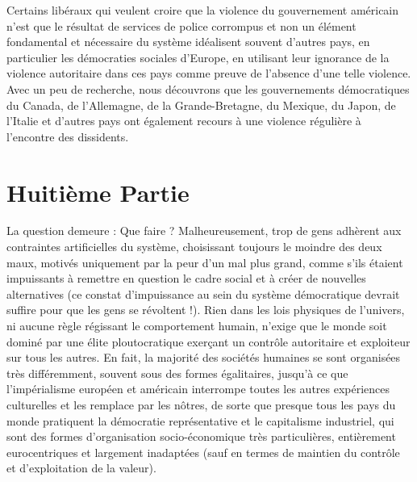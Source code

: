 Certains libéraux qui veulent croire que la violence du gouvernement américain n'est que le résultat de services de police corrompus et non un élément fondamental et nécessaire du système idéalisent souvent d'autres pays, en particulier les démocraties sociales d'Europe, en utilisant leur ignorance de la violence autoritaire dans ces pays comme preuve de l'absence d'une telle violence. Avec un peu de recherche, nous découvrons que les gouvernements démocratiques du Canada, de l'Allemagne, de la Grande-Bretagne, du Mexique, du Japon, de l'Italie et d'autres pays ont également recours à une violence régulière à l'encontre des dissidents.

\chapter*{\textbf{Huitième Partie}}\hypertarget{huitime-partie}{}\label{huitime-partie}

La question demeure : Que faire ? Malheureusement, trop de gens adhèrent aux contraintes artificielles du système, choisissant toujours le moindre des deux maux, motivés uniquement par la peur d’un mal plus grand, comme s'ils étaient impuissants à remettre en question le cadre social et à créer de nouvelles alternatives (ce constat d'impuissance au sein du système démocratique devrait suffire pour que les gens se révoltent !). Rien dans les lois physiques de l'univers, ni aucune règle régissant le comportement humain, n'exige que le monde soit dominé par une élite ploutocratique exerçant un contrôle autoritaire et exploiteur sur tous les autres. En fait, la majorité des sociétés humaines se sont organisées très différemment, souvent sous des formes égalitaires, jusqu'à ce que l'impérialisme européen et américain interrompe toutes les autres expériences culturelles et les remplace par les nôtres, de sorte que presque tous les pays du monde pratiquent la démocratie représentative et le capitalisme industriel, qui sont des formes d'organisation socio-économique très particulières, entièrement eurocentriques et largement inadaptées (sauf en termes de maintien du contrôle et d'exploitation de la valeur).

